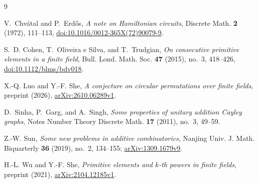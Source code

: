\documentclass{amsart}
\theoremstyle{remark}
\numberwithin{equation}{section}
\numberwithin{table}{section}
\begin{document}
\begin{thebibliography}{9}

V.~Chv\'atal and P.~Erd\H{o}s, \emph{A note on Hamiltonian circuits}, Discrete Math. \textbf{2} (1972), 111--113, \href{https://doi.org/10.1016/0012-365X(72)90079-9}{doi:10.1016/0012-365X(72)90079-9}.

S.~D. Cohen, T.~Oliveira e Silva, and T.~Trudgian, \emph{On consecutive primitive elements in a finite field}, Bull. Lond. Math. Soc. \textbf{47} (2015), no.~3, 418--426, \href{https://doi.org/10.1112/blms/bdv018}{doi:10.1112/blms/bdv018}.

X.-Q. Luo and Y.-F. She, \emph{A conjecture on circular permutations over finite fields}, preprint (2026), \href{https://arxiv.org/abs/2610.06289v1}{arXiv:2610.06289v1}.

D.~Sinha, P.~Garg, and A.~Singh, \emph{Some properties of unitary addition Cayley graphs}, Notes Number Theory Discrete Math. \textbf{17} (2011), no.~3, 49--59.

Z.-W. Sun, \emph{Some new problems in additive combinatorics}, Nanjing Univ. J. Math. Biquarterly \textbf{36} (2019), no.~2, 134--155; \href{https://arxiv.org/abs/1309.1679v9}{arXiv:1309.1679v9}.

H.-L. Wu and Y.-F. She, \emph{Primitive elements and $k$-th powers in finite fields}, preprint (2021), \href{https://arxiv.org/abs/2104.12185v1}{arXiv:2104.12185v1}.

\end{thebibliography}
\end{document}
